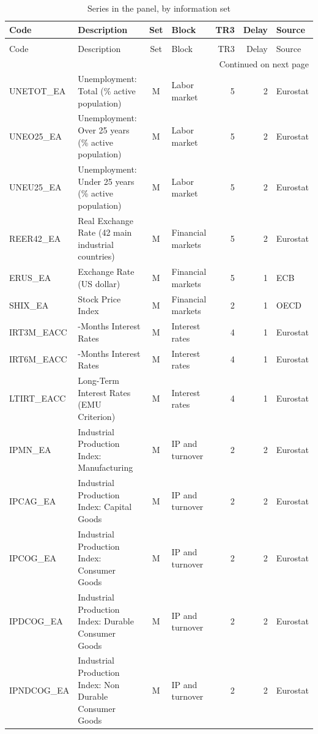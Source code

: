 \begin{longtable}{@{}l>{\raggedright\arraybackslash}p{7.4cm}clrr>{\raggedright\arraybackslash}p{2.6cm}@{}}
\caption{Series in the panel, by information set} \label{tab:series} \\
\toprule
Code & Description & Set & Block & TR3 & Delay & Source \\
\midrule
\endfirsthead
\caption[]{Series in the panel, by information set} \\
\toprule
Code & Description & Set & Block & TR3 & Delay & Source \\
\midrule
\endhead
\midrule
\multicolumn{7}{r}{Continued on next page} \\
\midrule
\endfoot
\bottomrule
\endlastfoot
UNETOT\_EA & Unemployment: Total (\% active population) & M & Labor market & 5 & 2 & Eurostat \\
UNEO25\_EA & Unemployment: Over 25 years (\% active population) & M & Labor market & 5 & 2 & Eurostat \\
UNEU25\_EA & Unemployment: Under 25 years (\% active population) & M & Labor market & 5 & 2 & Eurostat \\
REER42\_EA & Real Exchange Rate (42 main industrial countries) & M & Financial markets & 5 & 2 & Eurostat \\
ERUS\_EA & Exchange Rate (US dollar) & M & Financial markets & 5 & 1 & ECB \\
SHIX\_EA & Stock Price Index & M & Financial markets & 2 & 1 & OECD \\
IRT3M\_EACC & 3-Months Interest Rates & M & Interest rates & 4 & 1 & Eurostat \\
IRT6M\_EACC & 6-Months Interest Rates & M & Interest rates & 4 & 1 & Eurostat \\
LTIRT\_EACC & Long-Term Interest Rates (EMU Criterion) & M & Interest rates & 4 & 1 & Eurostat \\
IPMN\_EA & Industrial Production Index: Manufacturing & M & IP and turnover & 2 & 2 & Eurostat \\
IPCAG\_EA & Industrial Production Index: Capital Goods & M & IP and turnover & 2 & 2 & Eurostat \\
IPCOG\_EA & Industrial Production Index: Consumer Goods & M & IP and turnover & 2 & 2 & Eurostat \\
IPDCOG\_EA & Industrial Production Index: Durable Consumer Goods & M & IP and turnover & 2 & 2 & Eurostat \\
IPNDCOG\_EA & Industrial Production Index: Non Durable Consumer Goods & M & IP and turnover & 2 & 2 & Eurostat \\

\end{longtable}
